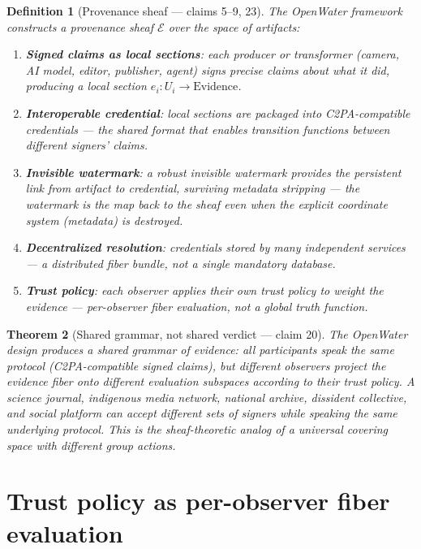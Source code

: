 \documentclass[11pt,a4paper]{article}
\newtheorem{definition}{Definition}[section]
\newtheorem{theorem}[definition]{Theorem}
\begin{document}
\begin{definition}[Provenance sheaf --- claims 5--9, 23]
\label{def:sheaf}
The OpenWater framework constructs a provenance sheaf $\mathcal{E}$
over the space of artifacts:
\begin{enumerate}
\item \textbf{Signed claims as local sections}: each producer or
  transformer (camera, AI model, editor, publisher, agent) signs
  precise claims about what it did, producing a local section
  $e_i : U_i \to \text{Evidence}$.
\item \textbf{Interoperable credential}: local sections are packaged
  into C2PA-compatible credentials --- the shared format that enables
  transition functions between different signers' claims.
\item \textbf{Invisible watermark}: a robust invisible watermark
  provides the persistent link from artifact to credential, surviving
  metadata stripping --- the watermark is the map back to the sheaf
  even when the explicit coordinate system (metadata) is destroyed.
\item \textbf{Decentralized resolution}: credentials stored by many
  independent services --- a distributed fiber bundle, not a single
  mandatory database.
\item \textbf{Trust policy}: each observer applies their own trust
  policy to weight the evidence --- per-observer fiber evaluation,
  not a global truth function.
\end{enumerate}
\end{definition}

\begin{theorem}[Shared grammar, not shared verdict --- claim 20]
\label{thm:grammar}
The OpenWater design produces a shared grammar of evidence: all
participants speak the same protocol (C2PA-compatible signed claims),
but different observers project the evidence fiber onto different
evaluation subspaces according to their trust policy. A science journal,
indigenous media network, national archive, dissident collective, and
social platform can accept different sets of signers while speaking the
same underlying protocol. This is the sheaf-theoretic analog of a
universal covering space with different group actions.
\end{theorem}

\section{Trust policy as per-observer fiber evaluation}
\label{sec:trust}
\end{document}
